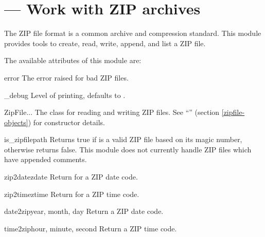 \section{ ---
         Work with ZIP archives}


The ZIP file format is a common archive and compression standard.
This module provides tools to create, read, write, append, and list a
ZIP file.

The available attributes of this module are:

\begin{excdesc}{error}
  The error raised for bad ZIP files.
\end{excdesc}

\begin{datadesc}{_debug}
  Level of printing, defaults to .
\end{datadesc}

\begin{classdesc}{ZipFile}{...}
  The class for reading and writing ZIP files.  See
  ``'' (section \ref{zipfile-objects}) for
  constructor details.
\end{classdesc}

\begin{funcdesc}{is_zipfile}{path} 
  Returns true if  is a valid ZIP file based on its magic
  number, otherwise returns false.  This module does not currently
  handle ZIP files which have appended comments.
\end{funcdesc}

\begin{funcdesc}{zip2date}{zdate}
  Return  for a ZIP date
  code.
\end{funcdesc}

\begin{funcdesc}{zip2time}{ztime}
  Return  for a ZIP
  time code.
\end{funcdesc}

\begin{funcdesc}{date2zip}{year, month, day}
  Return a ZIP date code. 
\end{funcdesc}

\begin{funcdesc}{time2zip}{hour, minute, second}
  Return a ZIP time code.
\end{funcdesc}

